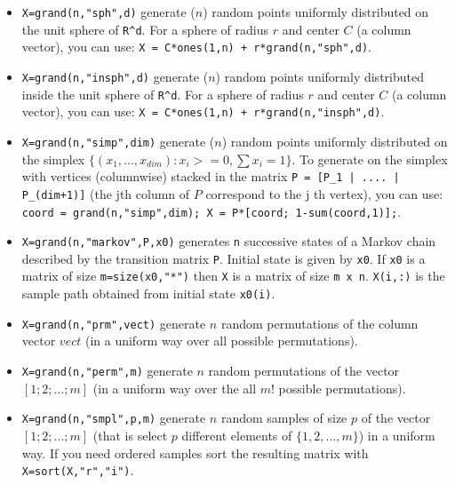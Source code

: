 \begin{enumerate}
\begin{itemize}
\item {}
  \verb!X=grand(n,"sph",d)! generate ($n$) random points uniformly
  distributed on the unit sphere of \verb!R^d!. For a sphere of radius
  $r$ and center $C$ (a column vector), you can use: 
  \verb!X = C*ones(1,n) + r*grand(n,"sph",d)!.
  
\item {}
  \verb!X=grand(n,"insph",d)! generate ($n$) random points uniformly
  distributed inside the unit sphere of \verb!R^d!. For a sphere of radius
  $r$ and center $C$ (a column vector), you can use: 
  \verb!X = C*ones(1,n) + r*grand(n,"insph",d)!.
  
\item {}
  \verb!X=grand(n,"simp",dim)! generate ($n$) random points uniformly
  distributed on the simplex $\{ (x_1,...,x_{dim}): x_i >=0, \sum
  x_i = 1 \}$. To generate on the simplex with vertices (columnwise) 
  stacked in the matrix \verb!P = [P_1 | .... | P_(dim+1)]! (the jth column of $P$ 
  correspond to the j th  vertex), you can use:
  \verb!coord = grand(n,"simp",dim); X = P*[coord; 1-sum(coord,1)];!.
 
\item {} 
  \verb!X=grand(n,"markov",P,x0)! generates \verb!n! successive states of a Markov chain 
  described  by the transition matrix \verb!P!. Initial state is  given by 
  \verb!x0!. If \verb!x0! is a matrix of size \verb!m=size(x0,"*")! 
  then \verb!X! is a matrix of size \verb!m x n!. \verb!X(i,:)! is the sample 
  path  obtained from initial state \verb!x0(i)!.

\item {} \verb!X=grand(n,"prm",vect)! generate $n$ random permutations of the
  column vector $vect$ (in a uniform way over all possible permutations).

\item {}
  \verb!X=grand(n,"perm",m)! generate $n$ random permutations of the
  vector $[1;2;...;m]$ (in a uniform way over the all $m!$ possible permutations).

\item {}
  \verb!X=grand(n,"smpl",p,m)! generate $n$ random samples of size $p$
  of the vector $[1;2;...;m]$ (that is select $p$ different elements
  of $\{1,2,...,m\}$) in a uniform way. If you need ordered samples
  sort the resulting matrix with \verb!X=sort(X,"r","i")!.

\end{itemize}

\end{enumerate}

